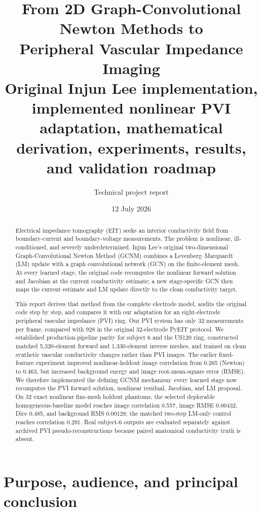 \documentclass[11pt]{article}
\title{\textbf{From 2D Graph-Convolutional Newton Methods to\\
Peripheral Vascular Impedance Imaging}\\[0.5em]
\large Original Injun Lee implementation, implemented nonlinear PVI adaptation,
mathematical derivation, experiments, results, and validation roadmap}
\author{Technical project report}
\date{12 July 2026}
\begin{document}
\maketitle

\begin{abstract}
Electrical impedance tomography (EIT) seeks an interior conductivity field from
boundary-current and boundary-voltage measurements.  The problem is nonlinear,
ill-conditioned, and severely underdetermined.  Injun Lee's original two-dimensional
Graph-Convolutional Newton Method (GCNM) combines a Levenberg--Marquardt (LM) update
with a graph convolutional network (GCN) on the finite-element mesh.  At every
learned stage, the original code recomputes the nonlinear forward solution and
Jacobian at the current conductivity estimate; a new stage-specific GCN then maps
the current estimate and LM update directly to the clean conductivity target.

This report derives that method from the complete electrode model, audits the
original code step by step, and compares it with our adaptation for an eight-electrode
peripheral vascular impedance (PVI) ring.  Our PVI system has only 32 measurements
per frame, compared with 928 in the original 32-electrode PyEIT protocol.  We
established production-pipeline parity for subject 6 and the US120 ring, constructed
matched 5,320-element forward and 1,330-element inverse meshes, and trained on clean
synthetic vascular conductivity changes rather than PVI images.  The earlier
fixed-feature experiment improved nonlinear-holdout image correlation from 0.265
(Newton) to 0.463, but increased background energy and image root-mean-square error
(RMSE).  We therefore implemented the defining GCNM mechanism: every learned stage
now recomputes the PVI forward solution, nonlinear residual, Jacobian, and LM
proposal.  On 32 exact nonlinear fine-mesh holdout phantoms, the selected deployable
homogeneous-baseline model reaches image correlation 0.557, image RMSE 0.00432,
Dice 0.485, and background RMS 0.00128; the matched two-step LM-only control reaches
correlation 0.291.  Real subject-6 outputs are evaluated separately against archived
PVI pseudo-reconstructions because paired anatomical conductivity truth is absent.
\end{abstract}

\tableofcontents
\newpage

\section{Purpose, audience, and principal conclusion}
\end{document}
